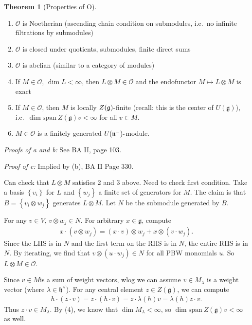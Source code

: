 \documentclass[11pt]{scrartcl}
\theoremstyle{definition}
\theoremstyle{theorem}
\newtheorem{theorem}{Theorem}[section]
\theoremstyle{proof}
\newenvironment{proof}
{\pushQED{$\qed$}\pf}
{\par\popQED\endpf}
\theoremstyle{definition}
\theoremstyle{break}
\theoremstyle{problem}
\newcommand{\dash}[0]{{\hbox{-}}}
\newcommand{\dual}[0]{^\vee}
\newcommand{\lieg}[0]{{\mathfrak{g}}}
\newcommand{\lieh}[0]{{\mathfrak{h}}}
\newcommand{\lien}[0]{{\mathfrak{n}}}
\newcommand{\spanof}[0]{{\mathrm{span}}}
\newcommand{\tensor}[0]{\otimes}
\newcommand{\theset}[1]{\left\{{#1}\right\}}
\renewcommand{\qed}[0]{\hfill\blacksquare}
\begin{document}
\begin{theorem}[Properties of O]

\hfill

\begin{enumerate}
\def\labelenumi{\alph{enumi}.}
\item
  \(\mathcal O\) is Noetherian (ascending chain condition on submodules,
  i.e.~no infinite filtrations by submodules)
\item
  \(\mathcal O\) is closed under quotients, submodules, finite direct
  sums
\item
  \(\mathcal O\) is abelian (similar to a category of modules)
\item
  If \(M\in \mathcal O\), \(\dim L < \infty\), then
  \(L \tensor M \in \mathcal O\) and the endofunctor
  \(M \mapsto L\tensor M\) is exact
\item
  If \(M\in \mathcal O\), then \(M\) is locally \(Z(\lieg)\dash\)finite
  (recall: this is the center of \(U(\lieg)\)),
  i.e.~\(\dim\spanof ~Z(\lieg)v < \infty\) for all \(v\in M\).
\item
  \(M\in \mathcal O\) is a finitely generated \(U(\lien^-)\dash\)module.
\end{enumerate}

\end{theorem}

\emph{Proofs of a and b:} See BA II, page 103.

\emph{Proof of c:} Implied by (b), BA II Page 330.

\begin{proof}[of (d)]

Can check that \(L\tensor M\) satisfies 2 and 3 above. Need to check
first condition. Take a basis \(\theset{v_i}\) for \(L\) and
\(\theset{w_j}\) a finite set of generators for \(M\). The claim is that
\(B = \theset{v_i \tensor w_j}\) generates \(L\tensor M\). Let \(N\) be
the submodule generated by \(B\).

For any \(v\in V\), \(v\tensor w_j \in N\). For arbitrary
\(x\in \lieg\), compute
\begin{align*}x\cdot(v\tensor w_j) = (x\cdot v) \tensor w_j + x\tensor (v\cdot w_j).\end{align*}
Since the LHS is in \(N\) and the first term on the RHS is in \(N\), the
entire RHS is in \(N\). By iterating, we find that
\(v\tensor (u\cdot w_j) \in N\) for all PBW monomials \(u\). So
\(L\tensor M \in \mathcal O\).\end{proof}

\begin{proof}[of (e)]

Since \(v\in M\)is a sum of weight vectors, wlog we can assume
\(v \in M_\lambda\) is a weight vector (where
\(\lambda \in \lieh\dual\)). For any central element \(z\in Z(\lieg)\),
we can compute
\begin{align*}h\cdot(z\cdot v) = z \cdot (h\cdot v) = z \cdot \lambda(h) v = \lambda(h)z \cdot v.\end{align*}
Thus \(z\cdot v\in M_\lambda\). By (4), we know that
\(\dim M_\lambda < \infty\), so \(\dim \spanof ~Z(\lieg) v < \infty\) as
well.\end{proof}
\end{document}
